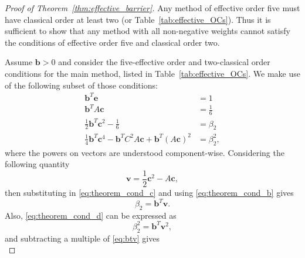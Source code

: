 \begin{proof}[Proof of Theorem~\ref{thm:effective_barrier}]
	Any method of effective order five must have classical order at least two
	\cite{Butcher2008_book} (or Table~\ref{tab:effective_OCs}).
    Thus it is sufficient to show that any method with all non-negative weights
    cannot satisfy the conditions of effective order five and classical order two.

    Assume $\bm{b} > 0$ and consider the five-effective order and two-classical
    order conditions for the main method, listed in Table~\ref{tab:effective_OCs}.  
    We make use of the following subset of those conditions:
    \begin{subequations}\label{eq:theorem_cond}
    		\begin{align}
    			\bm{b}^T\bm{e} & = 1 \label{eq:theorem_cond_a} \\
             	\bm{b}^TA\bm{c} &= \frac{1}{6} \label{eq:theorem_cond_b} \\
            	\frac{1}{2}\bm{b}^T\bm{c}^2 - \frac{1}{6} &= \beta_2 \label{eq:theorem_cond_c} \\
            	\frac{1}{4}\bm{b}^T\bm{c}^4 - \bm{b}^TC^2A\bm{c} + \bm{b}^T(A\bm{c})^2 &= \beta_2^2, \label{eq:theorem_cond_d}
        	\end{align}
	\end{subequations}
	where the powers on vectors are understood component-wise. 
	Considering the following quantity
	\begin{equation*} 
		\bm{v} = \frac{1}{2}\bm{c}^2 - A\bm{c},
	\end{equation*}
	then substituting in \eqref{eq:theorem_cond_c} and using 
	\eqref{eq:theorem_cond_b} gives
	\begin{equation}\label{eq:btv}
		\beta_2 = \bm{b}^T\bm{v}.
	\end{equation}
	Also, \eqref{eq:theorem_cond_d} can be expressed as
	\begin{equation*}%
		\beta_2^2 = \bm{b}^T\bm{v}^2,
	\end{equation*}
        and subtracting a multiple of \eqref{eq:btv} gives
	\begin{equation}\label{eq:beta_2_subtraction}

\end{equation}
\end{proof}
